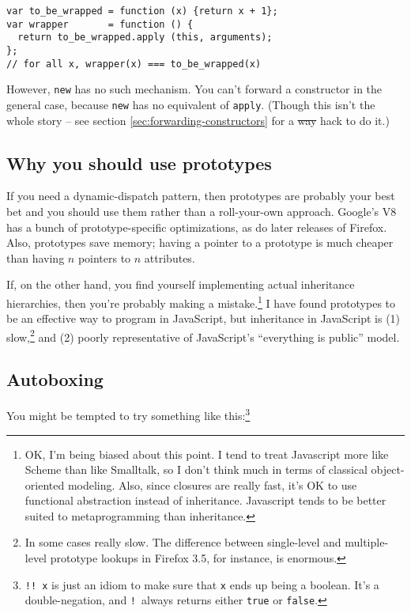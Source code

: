 \documentclass{article}
\begin{document}
\begin{verbatim}
var to_be_wrapped = function (x) {return x + 1};
var wrapper       = function () {
  return to_be_wrapped.apply (this, arguments);
};
// for all x, wrapper(x) === to_be_wrapped(x)
\end{verbatim}

    However, {\tt new} has no such mechanism. You can't forward a constructor in the general case, because {\tt new} has no equivalent of {\tt apply}. (Though this isn't the whole story -- see
    section \ref{sec:forwarding-constructors} for a \sout{way} hack to do it.)

\subsection {Why you should use prototypes}
    If you need a dynamic-dispatch pattern, then prototypes are probably your best bet and you should use them rather than a roll-your-own approach. Google's V8 has a bunch of
    prototype-specific optimizations, as do later releases of Firefox. Also, prototypes save memory; having a pointer to a prototype is much cheaper than having $n$ pointers to $n$ attributes.

    If, on the other hand, you find yourself implementing actual inheritance hierarchies, then you're probably making a mistake.\footnote{OK, I'm being biased about this point. I tend to treat
    Javascript more like Scheme than like Smalltalk, so I don't think much in terms of classical object-oriented modeling. Also, since closures are really fast, it's OK to use functional
    abstraction instead of inheritance. Javascript tends to be better suited to metaprogramming than inheritance.} I have found prototypes to be an effective way to program in JavaScript, but
    inheritance in JavaScript is (1) slow,\footnote{In some cases really slow. The difference between single-level and multiple-level prototype lookups in Firefox 3.5, for instance, is
    enormous.} and (2) poorly representative of JavaScript's ``everything is public'' model.

\subsection {Autoboxing}
    You might be tempted to try something like this:\footnote{{\tt !!~x} is just an idiom to make sure that {\tt x} ends up being a boolean. It's a double-negation, and {\tt !}~always
    returns either {\tt true} or {\tt false}.}
\end{document}
